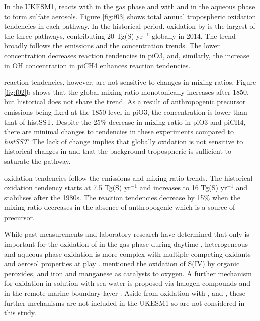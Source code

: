 In the UKESM1,  reacts with  in the gas phase and with  and  in the aqueous phase to form sulfate aerosols. Figure \ref{fig:f03} shows total annual tropospheric  oxidation tendencies in each pathway. In the historical period,  oxidation by  is the largest of the three pathways, contributing 20 Tg(S) yr$^{-1}$ globally in 2014. The  trend broadly follows the  emissions and the  concentration trends. The lower  concentration decreases  reaction tendencies in piO3, and, similarly, the increase in OH concentration in piCH4 enhances  reaction tendencies.

 reaction tendencies, however, are not sensitive to changes in  mixing ratios. Figure \ref{fig:f02}b shows that the global  mixing ratio monotonically increases after 1850, but historical  does not share the trend. As a result of anthropogenic  precursor emissions being fixed at the 1850 level in piO3, the  concentration is lower than that of histSST. Despite the 25\% decrease in  mixing ratio in piO3 and piCH4, there are minimal changes to  tendencies in these experiments compared to \textit{histSST}. The lack of change implies that globally  oxidation is not sensitive to historical changes in  and that the background tropospheric  is sufficient to saturate the pathway. 

 oxidation tendencies follow the  emissions and  mixing ratio trends. The historical oxidation tendency starts at 7.5 Tg(S) yr$^{-1}$ and increases to 16 Tg(S) yr$^{-1}$ and stabilises after the 1980s. The  reaction tendencies decrease by 15\% when the  mixing ratio decreases in the absence of anthropogenic  which is a source of  precursor. 


While past measurements and laboratory research have determined that only  is important for the oxidation of  in the gas phase during daytime \citep[][and reference therein]{rattiganUptakeGasphaseSO22000, eatoughConversionSO2Sulfate1994}, heterogeneous and aqueous-phase oxidation is more complex with multiple competing oxidants and aerosol properties at play \citep{pattantyusReviewSulfurDioxide2018, seinfeldAtmosphericChemistryPhysics2016}. \citet{seinfeldAtmosphericChemistryPhysics2016} mentioned the oxidation of S(IV) by organic peroxides, and iron and manganese as catalysts to oxygen. A further mechanism for  oxidation in solution with sea water is proposed via halogen compounds  and  in the remote marine boundary layer \citep{vogtMechanismHalogenRelease1996}. Aside from oxidation with ,  and , these further mechanisms are not included in the UKESM1 so are not considered in this study. 



